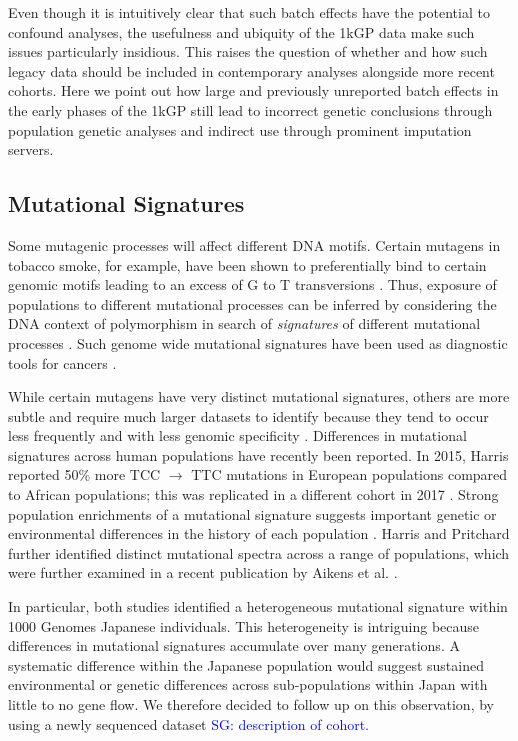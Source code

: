 \documentclass[9pt,lineno]{elife}
\newcommand{\sgcomment}[1]{\textcolor{blue}{SG: #1}}
\begin{document}
Even though it is intuitively clear that such batch effects have the potential to confound analyses, the usefulness and ubiquity of the 1kGP data make such issues particularly insidious.   
This raises the question of whether and how such legacy data should be included in contemporary analyses alongside more recent cohorts.
Here we point out how large and previously unreported batch effects in the early phases of the 1kGP still lead to incorrect genetic conclusions through population genetic analyses and indirect use through prominent imputation servers.


\subsection{Mutational Signatures}

Some mutagenic processes will affect different DNA motifs. 
Certain mutagens in tobacco smoke, for example, have been shown to preferentially bind to certain genomic motifs leading to an excess of G to T transversions \citep{Pfeifer2002,Pleasance2010}. 
Thus, exposure of populations to different mutational processes can be inferred by considering the DNA context of polymorphism in search of \textit{signatures} of different mutational processes \citep{Alexandrov2013,Shiraishi2015a}. 
Such genome wide mutational signatures have been used as diagnostic tools for cancers \citep{Alexandrov2013,Shiraishi2015a}.

While certain mutagens have very distinct mutational signatures, others are more subtle and require much larger datasets to identify because they tend to occur less frequently and with less genomic specificity \citep{Pleasance2010}.
Differences in mutational signatures across human populations have recently been reported.
In 2015, Harris reported 50\% more TCC ${\rightarrow}$ TTC mutations in European populations compared to African populations; this was replicated in a different cohort in 2017 \citep{Harris2015a, Harris2017a, Mathieson2017a}. 
Strong population enrichments of a mutational signature suggests important genetic or environmental differences in the history of each population \citep{Harris2015a, Harris2017a}. 
Harris and Pritchard further identified distinct mutational spectra across a range of populations, which were further examined in a recent publication by Aikens et al. \citep{Harris2017a,Aikens2018}.
 
 In particular, both studies  identified a heterogeneous mutational signature within 1000 Genomes Japanese individuals.
This heterogeneity is intriguing because differences in mutational signatures accumulate over many generations.
A systematic difference within the Japanese population would suggest sustained environmental or genetic differences across sub-populations within Japan with little to no gene flow.
We therefore decided to follow up on this observation, by using a newly sequenced dataset \sgcomment{description of cohort.}
\end{document}
